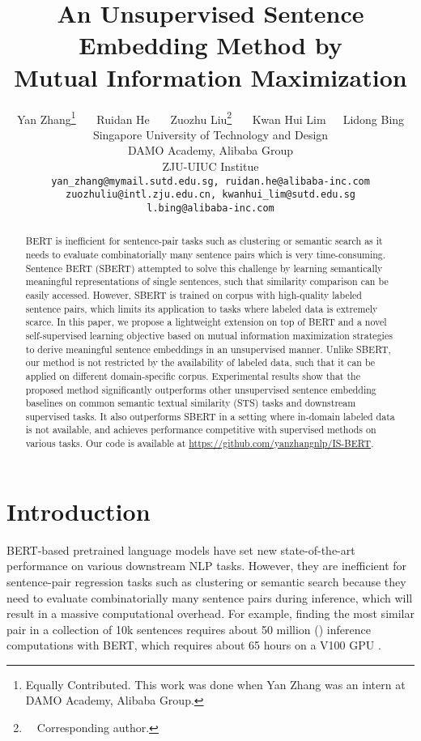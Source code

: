 \documentclass[11pt,a4paper]{article}
\title{An Unsupervised Sentence Embedding Method by \\ Mutual Information Maximization}
\author{Yan Zhang\thanks{ Equally Contributed. This work was  done when Yan Zhang was an intern at DAMO Academy, Alibaba Group.}~~~ Ruidan He~~~ Zuozhu Liu\thanks{~~Corresponding author.}~~~ Kwan Hui Lim~~~Lidong Bing \\
	Singapore University of Technology and Design \\
	DAMO Academy, Alibaba Group\\
	ZJU-UIUC Institue\\
	\texttt{yan\_zhang@mymail.sutd.edu.sg, ruidan.he@alibaba-inc.com}\\
	\texttt{zuozhuliu@intl.zju.edu.cn, kwanhui\_lim@sutd.edu.sg} \\
	\texttt{l.bing@alibaba-inc.com}}
\date{}
\begin{document}
\maketitle

\begin{abstract}



BERT is inefficient for sentence-pair tasks such as clustering or semantic search as it needs to evaluate combinatorially many sentence pairs which is very time-consuming. Sentence BERT (SBERT) attempted to solve this challenge by learning semantically meaningful representations of single sentences, such that similarity comparison can be easily accessed. However, SBERT is trained on corpus with high-quality labeled sentence pairs, which limits its application to tasks where labeled data is extremely scarce. In this paper, we propose a lightweight extension on top of BERT and a novel self-supervised learning objective based on mutual information maximization strategies to derive meaningful sentence embeddings in an unsupervised manner. 
Unlike SBERT, our method is not restricted by the availability of labeled data, such that it can be applied on different domain-specific corpus.
Experimental results show that the proposed method significantly outperforms other unsupervised sentence embedding baselines on common semantic textual similarity (STS) tasks and downstream supervised tasks. It also outperforms SBERT in a setting where in-domain labeled data is not available, and achieves performance competitive with supervised methods on various tasks. Our code is available at \url{https://github.com/yanzhangnlp/IS-BERT}.

\end{abstract} \section{Introduction}












BERT-based pretrained language models \cite{devlin2019bert, liu2019roberta} have set new state-of-the-art performance on various downstream NLP tasks. However, they are inefficient for sentence-pair regression tasks such as clustering or semantic search because they need to evaluate combinatorially many sentence pairs during inference, which will result in a massive computational overhead. For example, finding the most similar pair in a collection of 10k sentences requires about 50 million ()  inference computations with BERT, which requires about 65 hours on a V100 GPU \cite{reimers2019}. 
\end{document}
